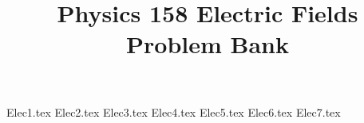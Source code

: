\documentclass[11pt, fleqn]{article}
\title{Physics 158 Electric Fields Problem Bank}
\author{}
\date{}
\begin{document}
\allowdisplaybreaks

\maketitle

{Elec1.tex}
{Elec2.tex}
{Elec3.tex}
{Elec4.tex}
{Elec5.tex}
{Elec6.tex}
{Elec7.tex}
\end{document}
